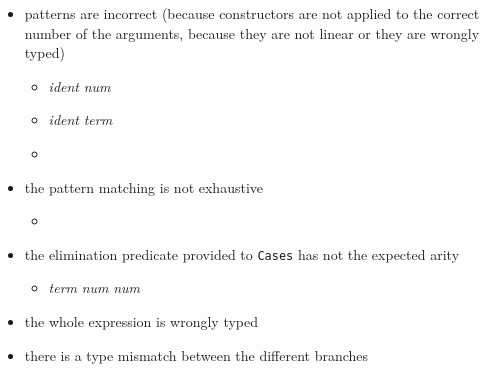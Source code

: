 \begin{itemize}
\item patterns are incorrect (because constructors are not applied to
  the correct number of the arguments, because they are not linear or
  they are wrongly typed)
\begin{itemize}
\item {} {\sl
    ident}  {\sl num} 
  
\item {} {\sl ident}  {\sl term}
  
\item {} {\term}
  {\term} 
\end{itemize}

\item the pattern matching is not exhaustive
\begin{itemize}
\item {}
\end{itemize}
\item the elimination predicate provided to \texttt{Cases} has not the
  expected arity

\begin{itemize}
\item {} {\sl term}  {\sl num}  {\sl
    num} 
\end{itemize}

\item the whole expression is wrongly typed

 
  
\item there is a type mismatch between the different branches


\end{itemize}
